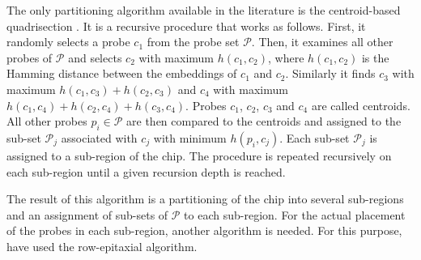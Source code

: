 \documentclass{llncs}
\newcommand{\ignore}[1]{}
\begin{document}
The only partitioning algorithm available in the literature is the centroid-based
quadrisection \cite{KAHNG03B}. It is a recursive procedure that works as follows.
First, it randomly selects a probe $c_1$ from the probe set $\mathcal{P}$. Then,
it examines all other probes of $\mathcal{P}$ and selects $c_2$ with maximum
$h(c_1,c_2)$, where $h(c_1,c_2)$ is the Hamming distance between the embeddings
of $c_1$ and $c_2$. Similarly it finds $c_3$ with maximum $h(c_1,c_3) + h(c_2,c_3)$
and $c_4$ with maximum $h(c_1,c_4) + h(c_2,c_4) + h(c_3,c_4)$. Probes
$c_1$, $c_2$, $c_3$ and $c_4$ are called centroids. All other probes
$p_i \in \mathcal{P}$ are then compared to the centroids and assigned to the sub-set
$\mathcal{P}_j$ associated with $c_j$ with minimum $h(p_i,c_j)$. Each sub-set
$\mathcal{P}_j$ is assigned to a sub-region of the chip. The procedure is repeated
recursively on each sub-region until a given recursion depth is reached.

The result of this algorithm is a partitioning of the chip into several sub-regions
and an assignment of sub-sets of $\mathcal{P}$ to each sub-region. For the actual
placement of the probes in each sub-region, another algorithm is needed. For this
purpose, \cite{KAHNG03B} have used the row-epitaxial algorithm. 

\ignore{Their results show that the running time of the row-epitaxial algorithm
drops significantly with increasing recursion depth. The time required to place
the probes of a 500\,x\,500 chip, for instance, dropped by 69\% with $L = 3$ when
compared with the time required by the row-epitaxial without any partitioning.

It is not clear from their experiments, however, how the choice of $L$ impaired
the performance of the row-epitaxial algorithm in terms of solution quality since
they have restricted their experiments to $L \leq 3$. Moreover, there is no clear
trend toward reduction or increase in border length as $L$ varies from~0 to~3.}
\end{document}
